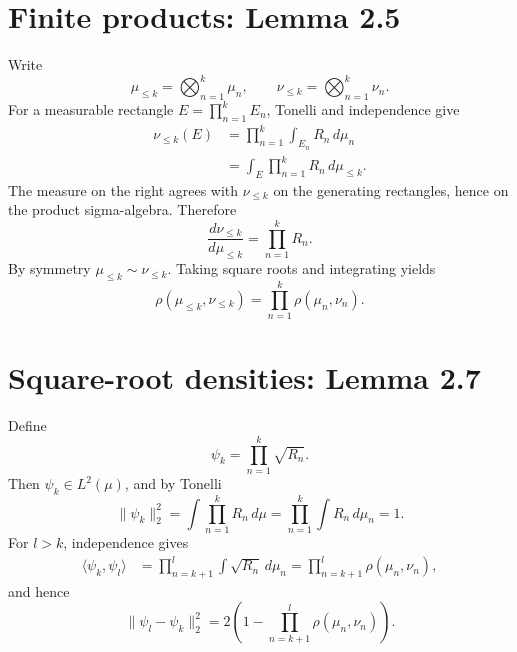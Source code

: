 \section{Finite products: Lemma 2.5}
Write
\[
 \mu_{\le k}=\bigotimes_{n=1}^k\mu_n,
 \qquad
 \nu_{\le k}=\bigotimes_{n=1}^k\nu_n.
\]
For a measurable rectangle \(E=\prod_{n=1}^kE_n\), Tonelli and independence give
\begin{align*}
 \nu_{\le k}(E)
 &=\prod_{n=1}^k\int_{E_n}R_n\,d\mu_n\\
 &=\int_E\prod_{n=1}^kR_n\,d\mu_{\le k}.
\end{align*}
The measure on the right agrees with \(\nu_{\le k}\) on the generating rectangles, hence on the
product sigma-algebra.  Therefore
\begin{equation}\label{eq:kak-finite-rn}
 \frac{d\nu_{\le k}}{d\mu_{\le k}}=\prod_{n=1}^kR_n.
\end{equation}
By symmetry \(\mu_{\le k}\sim\nu_{\le k}\).  Taking square roots and integrating yields
\begin{equation}\label{eq:kak-finite-affinity}
 \rho(\mu_{\le k},\nu_{\le k})
 =\prod_{n=1}^k\rho(\mu_n,\nu_n).
\end{equation}

\section{Square-root densities: Lemma 2.7}
Define
\begin{equation}\label{eq:kak-psi}
 \psi_k=\prod_{n=1}^k\sqrt{R_n}.
\end{equation}
Then \(\psi_k\in L^2(\mu)\), and by Tonelli
\[
 \|\psi_k\|_2^2
 =\int\prod_{n=1}^kR_n\,d\mu
 =\prod_{n=1}^k\int R_n\,d\mu_n=1.
\]
For \(l>k\), independence gives
\begin{align*}
 \langle\psi_k,\psi_l\rangle
 &=\prod_{n=k+1}^l\int\sqrt{R_n}\,d\mu_n
 =\prod_{n=k+1}^l\rho(\mu_n,\nu_n),
\end{align*}
and hence
\begin{equation}\label{eq:kak-cauchy}
 \|\psi_l-\psi_k\|_2^2
 =2\left(1-\prod_{n=k+1}^l\rho(\mu_n,\nu_n)\right).
\end{equation}

